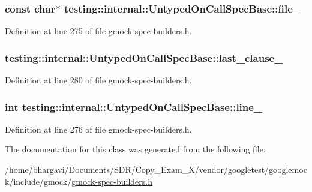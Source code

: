 \subsubsection[{\texorpdfstring{file\+\_\+}{file_}}]{\setlength{\rightskip}{0pt plus 5cm}const char$\ast$ testing\+::internal\+::\+Untyped\+On\+Call\+Spec\+Base\+::file\+\_\+\hspace{0.3cm}{\ttfamily [protected]}}\hypertarget{classtesting_1_1internal_1_1_untyped_on_call_spec_base_adf4e6c5022dfeb482f5328e9bb58ba88}{}\label{classtesting_1_1internal_1_1_untyped_on_call_spec_base_adf4e6c5022dfeb482f5328e9bb58ba88}


Definition at line 275 of file gmock-\/spec-\/builders.\+h.

\subsubsection[{\texorpdfstring{last\+\_\+clause\+\_\+}{last_clause_}}]{ testing\+::internal\+::\+Untyped\+On\+Call\+Spec\+Base\+::last\+\_\+clause\+\_\+\hspace{0.3cm}{\ttfamily [protected]}}\hypertarget{classtesting_1_1internal_1_1_untyped_on_call_spec_base_adb6d19adfeb5fde535d854aedbc5fb0f}{}\label{classtesting_1_1internal_1_1_untyped_on_call_spec_base_adb6d19adfeb5fde535d854aedbc5fb0f}


Definition at line 280 of file gmock-\/spec-\/builders.\+h.

\subsubsection[{\texorpdfstring{line\+\_\+}{line_}}]{\setlength{\rightskip}{0pt plus 5cm}int testing\+::internal\+::\+Untyped\+On\+Call\+Spec\+Base\+::line\+\_\+\hspace{0.3cm}{\ttfamily [protected]}}\hypertarget{classtesting_1_1internal_1_1_untyped_on_call_spec_base_a1dfa0dafaae6697f17adf5d837ca77c7}{}\label{classtesting_1_1internal_1_1_untyped_on_call_spec_base_a1dfa0dafaae6697f17adf5d837ca77c7}


Definition at line 276 of file gmock-\/spec-\/builders.\+h.



The documentation for this class was generated from the following file\+:\begin{DoxyCompactItemize}
\item 
/home/bhargavi/\+Documents/\+S\+D\+R/\+Copy\+\_\+\+Exam\+\_\+X/vendor/googletest/googlemock/include/gmock/\hyperlink{gmock-spec-builders_8h}{gmock-\/spec-\/builders.\+h}\end{DoxyCompactItemize}
